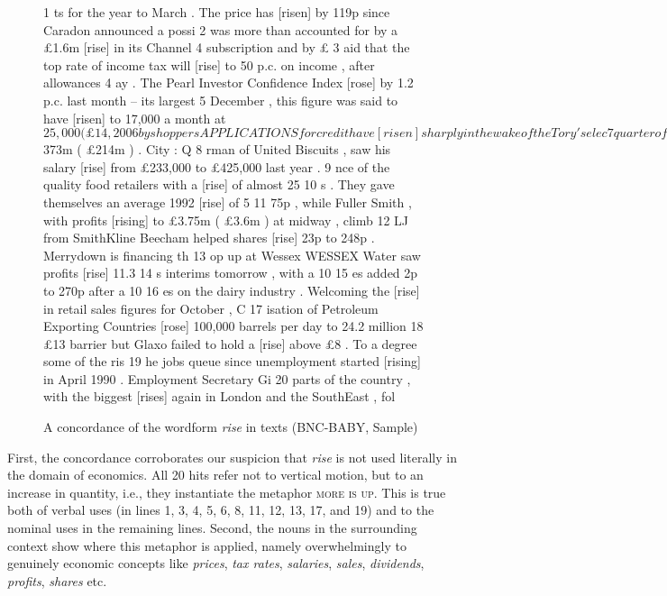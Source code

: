 \begin{figure}[!htbp]
\caption{A concordance of the wordform \textit{rise} in  texts (BNC-BABY, Sample)}
\label{fig:riseconc}
\begin{fitverb}
 1  ts for the year to March . The price has [risen] by 119p since Caradon announced a possi
 2    was more than accounted for by a £1.6m [rise] in its Channel 4 subscription and by £
 3  aid that the top rate of income tax will [rise] to 50 p.c. on income , after allowances
 4  ay . The Pearl Investor Confidence Index [rose] by 1.2 p.c. last month -- its largest 
 5   December , this figure was said to have [risen] to 17,000 a month at $25,000 ( £14,200 
 6  by shoppers APPLICATIONS for credit have [risen] sharply in the wake of the Tory 's elec
 7   quarter of the year , despite a 15 p.c. [rise] in sales to $373m ( £214m ) . City : Q
 8  rman of United Biscuits , saw his salary [rise] from £233,000 to £425,000 last year .
 9  nce of the quality food retailers with a [rise] of almost 25%
10  s . They gave themselves an average 1992 [rise] of 5%
11   75p , while Fuller Smith , with profits [rising] to £3.75m ( £3.6m ) at midway , climb
12  LJ from SmithKline Beecham helped shares [rise] 23p to 248p . Merrydown is financing th
13  op up at Wessex WESSEX Water saw profits [rise] 11.3%
14  s interims tomorrow , with a 10%
15  es added 2p to 270p after a 10%
16  es on the dairy industry . Welcoming the [rise] in retail sales figures for October , C
17  isation of Petroleum Exporting Countries [rose] 100,000 barrels per day to 24.2 million
18    £13 barrier but Glaxo failed to hold a [rise] above £8 . To a degree some of the ris
19  he jobs queue since unemployment started [rising] in April 1990 . Employment Secretary Gi
20   parts of the country , with the biggest [rises] again in London and the SouthEast , fol
\end{fitverb}
\end{figure}

First, the concordance corroborates our suspicion that \textit{rise} is not used literally in the domain of economics. All 20 hits refer not to vertical motion, but to an increase in quantity, i.e., they instantiate the metaphor \textsc{more is up}. This is true both of verbal uses (in lines 1, 3, 4, 5, 6, 8, 11, 12, 13, 17, and 19) and to the nominal uses in the remaining lines. Second, the nouns in the surrounding context show where this metaphor is applied, namely overwhelmingly to genuinely economic concepts like \textit{prices}, \textit{tax rates}, \textit{salaries}, \textit{sales}, \textit{dividends}, \textit{profits}, \textit{shares} etc.

